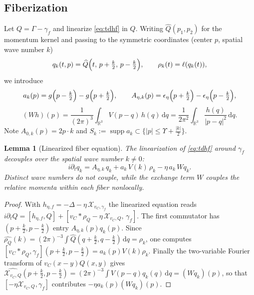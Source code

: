 \documentclass[11pt,a4paper]{amsart}
\newtheorem{lemma}[theorem]{Lemma}
\theoremstyle{definition}
\theoremstyle{remark}
\newcommand{\R}{\mathbb{R}}
\newcommand{\supp}{\operatorname{supp}}
\newcommand{\dd}{\,\mathrm{d}}
\newcommand{\ellf}{\ell}
\newcommand{\sX}{\mathcal{X}}
\begin{document}
\subsection{Fiberization}\label{sec:fiber}
Let $Q=\Gamma-\gamma_f$ and linearize \eqref{eq:tdhf} in $Q$. Writing $\widehat Q(p_1,p_2)$ for the momentum kernel and passing to the symmetric coordinates (center $p$, spatial wave number $k$)
\begin{equation}\label{eq:fibercoord}
q_k(t,p)=\widehat Q\Bigl(t,\,p+\tfrac k2,\,p-\tfrac k2\Bigr),\qquad
\rho_k(t)=\ellf(q_k(t)),
\end{equation}
we introduce
\begin{equation}\label{eq:aA}
a_k(p)=g\Bigl(p-\tfrac k2\Bigr)-g\Bigl(p+\tfrac k2\Bigr),\qquad
A_{\eta,k}(p)=\epsilon_\eta\Bigl(p+\tfrac k2\Bigr)-\epsilon_\eta\Bigl(p-\tfrac k2\Bigr),
\end{equation}
\begin{equation}\label{eq:W}
(Wh)(p)=\frac{1}{(2\pi)^3}\int_{\R^3}V(p-q)\,h(q)\dd q
=\frac{1}{2\pi^2}\int_{\R^3}\frac{h(q)}{|p-q|^2}\dd q .
\end{equation}
Note $A_{0,k}(p)=2p\cdot k$ and $S_k:=\supp a_k\subset\{|p|\le\Upsilon+\tfrac{|k|}2\}$.

\begin{lemma}[Linearized fiber equation]\label{lem:fiber}
The linearization of \eqref{eq:tdhf} around $\gamma_f$ decouples over the spatial wave number $k\ne0$:
\begin{equation}\label{eq:fibereq}
i\partial_t q_k=A_{\eta,k}\,q_k+a_k\,V(k)\,\rho_k-\eta\,a_k\,Wq_k .
\end{equation}
Distinct wave numbers do not couple, while the exchange term $W$ couples the relative momenta within each fiber nonlocally.
\end{lemma}

\begin{proof}
With $h_{\eta,f}=-\Delta-\eta\,\sX_{v_C,\gamma_f}$ the linearized equation reads
$i\partial_tQ=[h_{\eta,f},Q]+[v_C*\rho_Q-\eta\,\sX_{v_C,Q},\,\gamma_f]$.
The first commutator has $(p+\frac k2,p-\frac k2)$ entry $A_{\eta,k}(p)q_k(p)$. Since $\widehat{\rho_Q}(k)=(2\pi)^{-3}\int\widehat Q(q+\frac k2,q-\frac k2)\dd q=\rho_k$, one computes
$[v_C*\rho_Q,\gamma_f](p+\frac k2,p-\frac k2)=a_k(p)V(k)\rho_k$. Finally the two-variable Fourier transform of $v_C(x-y)Q(x,y)$ gives
$\widehat{\sX_{v_C,Q}}(p+\frac k2,p-\frac k2)=(2\pi)^{-3}\int V(p-q)q_k(q)\dd q=(Wq_k)(p)$,
so that $[-\eta\sX_{v_C,Q},\gamma_f]$ contributes $-\eta a_k(p)(Wq_k)(p)$.
\end{proof}
\end{document}
